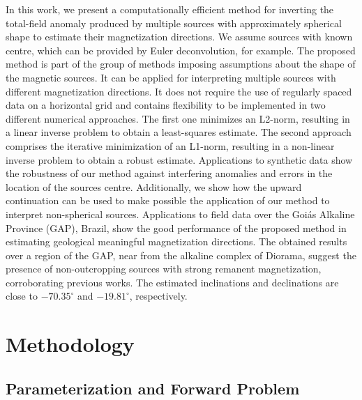\documentclass[journal abbreviation, npg]{copernicus}
\begin{document}
In this work, we present a computationally efficient method for inverting the total-field anomaly produced by multiple sources with approximately spherical shape to estimate their magnetization directions. We assume sources with known centre, which can be provided by Euler deconvolution, for example. The proposed method is part of the group of methods imposing assumptions about the shape of the magnetic sources. It can be applied for interpreting multiple sources with different magnetization directions. It does not require the use of regularly spaced data on a horizontal grid and contains flexibility to be implemented in two different numerical approaches. The first one minimizes an L2-norm, resulting in a linear inverse problem to obtain a least-squares estimate. The second approach comprises the iterative minimization of an L1-norm, resulting in a non-linear inverse problem to obtain a robust estimate. Applications to synthetic data show the robustness of our method against interfering anomalies and errors in the location of the sources centre. Additionally, we show how the upward continuation can be used to make possible the application of our method to interpret non-spherical sources. Applications to field data over the Goiás Alkaline Province (GAP), Brazil, show the good performance of the proposed method in estimating geological meaningful magnetization directions. The obtained results over a region of the GAP, near from the alkaline complex of Diorama, suggest the presence of non-outcropping sources with strong remanent magnetization, corroborating previous works. The estimated inclinations and declinations are close to $-70.35^{\circ}$ and $-19.81^{\circ}$, respectively.

\section{Methodology}

\subsection{Parameterization and Forward Problem}
\end{document}
